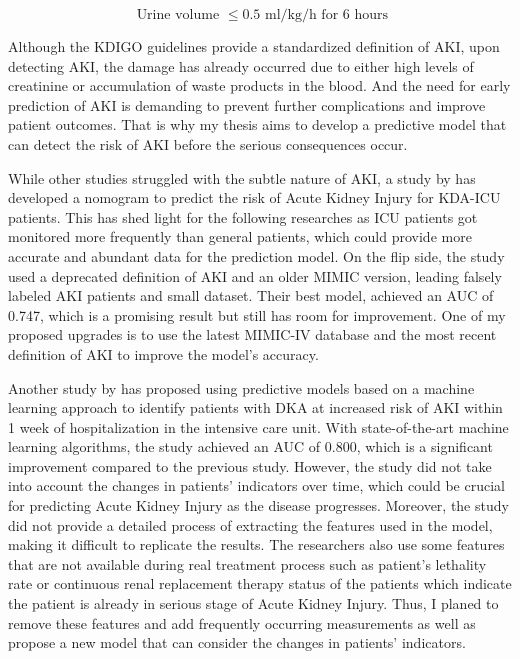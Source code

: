 \documentclass[../main.tex]{subfiles}
\begin{document}
\begin{equation}
    \text{ Urine volume } \le 0.5 \text{ ml/kg/h for 6 hours}
\end{equation}

Although the KDIGO guidelines provide a standardized definition of AKI, upon detecting AKI, the damage has already occurred due to either high levels of creatinine or accumulation of waste products in the blood.
And the need for early prediction of AKI is demanding to prevent further complications and improve patient outcomes.
That is why my thesis aims to develop a predictive model that can detect the risk of AKI before the serious consequences occur.

While other studies struggled with the subtle nature of AKI, a study by \citeauthor{monogram-aki-dka} has developed a nomogram to predict the risk of Acute Kidney Injury for KDA-ICU patients.
This has shed light for the following researches as ICU patients got monitored more frequently than general patients, which could provide more accurate and abundant data for the prediction model.
On the flip side, the study used a deprecated definition of AKI and an older MIMIC version, leading falsely labeled AKI patients and small dataset.
Their best model, achieved an AUC of 0.747, which is a promising result but still has room for improvement.
One of my proposed upgrades is to use the latest MIMIC-IV database and the most recent definition of AKI to improve the model's accuracy.

Another study by \citeauthor{xgboost-aki-dka} has proposed using predictive models based on a machine learning approach to identify patients with DKA at increased risk of AKI within 1 week of hospitalization in the intensive care unit.
With state-of-the-art machine learning algorithms, the study achieved an AUC of 0.800, which is a significant improvement compared to the previous study.
However, the study did not take into account the changes in patients' indicators over time, which could be crucial for predicting Acute Kidney Injury as the disease progresses.
Moreover, the study did not provide a detailed process of extracting the features used in the model, making it difficult to replicate the results.
The researchers also use some features that are not available during real treatment process such as patient's lethality rate or continuous renal replacement therapy status of the patients which indicate the patient is already in serious stage of Acute Kidney Injury.
Thus, I planed to remove these features and add frequently occurring measurements as well as propose a new model that can consider the changes in patients' indicators.
\end{document}
